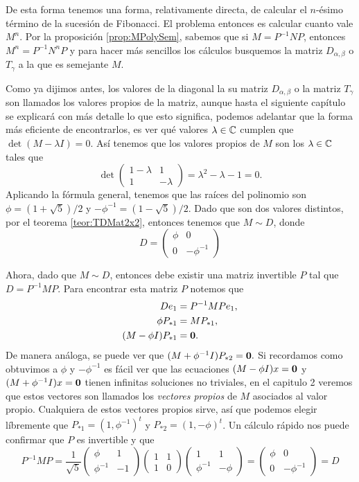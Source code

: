 De esta forma tenemos una forma, relativamente directa, de calcular el $n$-ésimo término de la sucesión de Fibonacci. El problema entonces es calcular cuanto vale $M^n$. Por la proposición \ref{prop:MPolySem}, sabemos que si $M = P^{-1}NP$, entonces $M^n = P^{-1} N^n P$ y para hacer más sencillos los cálculos busquemos la matriz $D_{\alpha,\beta}$ o $T_\gamma$ a la que es semejante $M$.

Como ya dijimos antes, los valores de la diagonal la su matriz $D_{\alpha,\beta}$ o la matriz $T_\gamma$ son llamados los valores propios de la matriz, aunque hasta el siguiente capítulo se explicará con más detalle lo que esto significa, podemos adelantar que la forma más eficiente de encontrarlos, es ver qué valores $\lambda \in \mathbb{C}$ cumplen que $\det(M-\lambda I) = 0$. Así tenemos que los valores propios de $M$ son los $\lambda \in \mathbb{C}$ tales que
\[
  \det\begin{pmatrix} 1-\lambda & 1 \\ 1 & -\lambda \end{pmatrix} = \lambda^2 - \lambda - 1 = 0.
\]
Aplicando la fórmula general, tenemos que las raíces del polinomio son $\phi = (1+\sqrt{5})/2$ y $-\phi^{-1} = (1-\sqrt{5})/2$. Dado que son dos valores distintos, por el teorema \ref{teor:TDMat2x2}, entonces tenemos que $M \sim D$, donde
\[
  D = \begin{pmatrix}
    \phi & 0 \\
    0 & -\phi^{-1}
  \end{pmatrix}
\]

Ahora, dado que $M \sim D$, entonces debe existir una matriz invertible $P$ tal que $D = P^{-1} M P$. Para encontrar esta matriz $P$ notemos que
\begin{align*}
  De_1 &=  P^{-1} M Pe_1, \\
  \phi P_{*1} &= M P_{*1}, \\
  (M - \phi I)P_{*1} &= \mathbf{0}.
\end{align*}
De manera análoga, se puede ver que $(M + \phi^{-1} I)P_{*2} = \mathbf{0}.$ Si recordamos como obtuvimos a $\phi$ y $-\phi^{-1}$ es fácil ver que las ecuaciones $(M - \phi I)x = \mathbf{0}$ y $(M + \phi^{-1} I)x = \mathbf{0}$ tienen infinitas soluciones no triviales, en el capitulo 2 veremos que estos vectores son llamados los \emph{vectores propios} de $M$ asociados al valor propio. Cualquiera de estos vectores propios sirve, así que podemos elegir líbremente que $P_{*1} = (1, \phi^{-1})^t$ y $P_{*2} = (1, -\phi)^t$. Un cálculo rápido nos puede confirmar que $P$ es invertible y que
\[
  P^{-1} M P = 
  \frac{1}{\sqrt{5}}\begin{pmatrix} \phi & 1 \\ \phi^{-1} & -1 \end{pmatrix}
  \begin{pmatrix} 1 & 1 \\ 1 & 0 \end{pmatrix}
  \begin{pmatrix} 1 & 1 \\ \phi^{-1} & -\phi \end{pmatrix} =
  \begin{pmatrix} \phi & 0 \\ 0 & -\phi^{-1} \end{pmatrix} = D
\]

